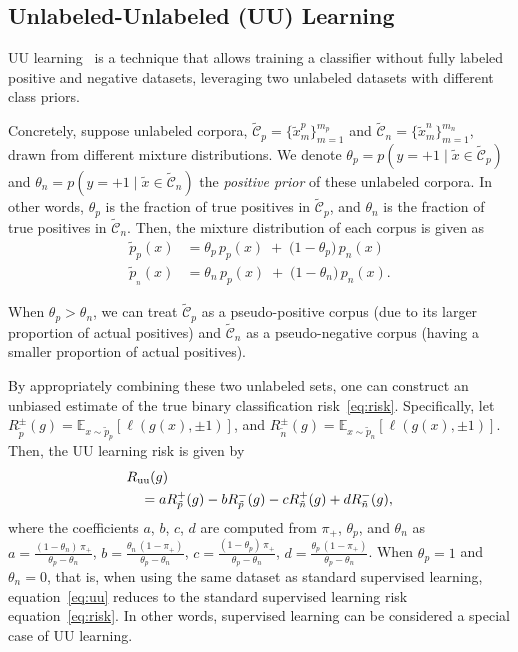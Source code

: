 \subsection{Unlabeled-Unlabeled (UU) Learning}
\label{subsec:uu}
UU learning~\citep{Lu2019-sd} is a technique that allows training a classifier without fully labeled positive and negative datasets, leveraging two unlabeled datasets with different class priors.

Concretely, suppose unlabeled corpora, $\widetilde{\mathcal{C}}_p = \{\widetilde{x}^p_m\}_{m=1}^{m_p}$ and $\widetilde{\mathcal{C}}_n = \{\widetilde{x}^n_m\}_{m=1}^{m_n}$, drawn from different mixture distributions. We denote $\theta_p = p(y=+1 \mid \widetilde{x}\in \widetilde{\mathcal{C}}_p)$ and $\theta_n = p(y=+1 \mid \widetilde{x}\in \widetilde{\mathcal{C}}_n)$ the \emph{positive prior} of these unlabeled corpora. In other words, $\theta_p$ is the fraction of true positives in $\widetilde{\mathcal{C}}_p$, and $\theta_n$ is the fraction of true positives in $\widetilde{\mathcal{C}}_n$. Then, the mixture distribution of each corpus is given as
\begin{align*}
    \widetilde{p}_{p}(x) &= \theta_p\, p_{p}(x) \;+\; \bigl(1 - \theta_p\bigr)\, p_{n}(x) \\
    \widetilde{p}_{_n}(x) &= \theta_n\, p_{p}(x) \;+\; \bigl(1 - \theta_n\bigr)\, p_{n}(x).        
\end{align*}

When $\theta_p > \theta_n$, we can treat $\widetilde{\mathcal{C}}_p$ as a pseudo-positive corpus (due to its larger proportion of actual positives) and $\widetilde{\mathcal{C}}_n$ as a pseudo-negative corpus (having a smaller proportion of actual positives). 

By appropriately combining these two unlabeled sets, one can construct an unbiased estimate of the true binary classification risk~\eqref{eq:risk}. Specifically, let $R_{\tilde{p}}^{\pm}(g)=\mathbb{E}_{x\sim \widetilde{p}_p}[\ell(g(x),\pm 1)]$, and $R_{\tilde{n}}^{\pm} (g)=\mathbb{E}_{x\sim \widetilde{p}_n}[\ell(g(x),\pm 1)]$. Then, the UU learning risk is given by
\begin{align}
    &R_{\mathrm{uu}}(g)\label{eq:uu}
    \\
    &\hspace{1em}= a R_{\tilde{p}}^+(g) - b R_{\tilde{p}}^-(g) - c R_{\tilde{n}}^+(g) + d R_{\tilde{n}}^-(g),\notag
\end{align}
where the coefficients $a$, $b$, $c$, $d$ are computed from $\pi_+$, $\theta_p$, and $\theta_n$ as $a = \frac{(1-\theta_n)\,\pi_+}{\theta_p - \theta_n}$, $b = \frac{\theta_n\,(1-\pi_+)}{\theta_p - \theta_n}$, $c = \frac{(1-\theta_p)\,\pi_+}{\theta_p - \theta_n}$, $d = \frac{\theta_p\,(1-\pi_+)}{\theta_p - \theta_n}$. When $\theta_p = 1$ and $\theta_n = 0$, that is, when using the same dataset as standard supervised learning, equation~\eqref{eq:uu} reduces to the standard supervised learning risk equation~\eqref{eq:risk}. In other words, supervised learning can be considered a special case of UU learning.

